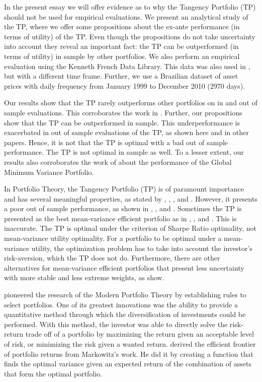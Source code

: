 \documentclass[12pt,oneside,a4paper]{memoir}
\begin{document}
In the present essay we will offer evidence as to why the Tangency Portfolio (TP) should not be used for empirical evaluations.
We present an analytical study of the TP, where we offer some propositions about the ex-ante performance (in terms of utility) of the TP.
Even though the propositions do not take uncertainty into account they reveal an important fact: the TP can be outperformed (in terms of utility) in sample by other portfolios.
We also perform an empirical evaluation using the Kenneth French Data Library.
This data was also used in , but with a different time frame.
Further, we use a Brazilian dataset of asset prices with daily frequency from January 1999 to December 2010 (2970 days).

Our results show that the TP rarely outperforms other portfolios on in and out of sample evaluations.
This corroborates the work in .
Further, our propositions show that the TP can be outperformed in sample.
This underperformance is exacerbated in out of sample evaluations of the TP, as shown here and in other papers. Hence, it is not that the TP is optimal with a bad out of sample performance. The TP is not optimal in sample as well.
To a lesser extent, our results also corroborates the work of  about the performance of the Global Minimum Variance Portfolio.

In Portfolio Theory, the Tangency Portfolio (TP) is of paramount importance and has several meaningful properties, as stated by , , , and .
However, it presents a poor out of sample performance, as shown in , , and .
Sometimes the TP is presented as the best mean-variance efficient portfolio as in , , and .
This is inaccurate.
The TP is optimal under the criterion of Sharpe Ratio optimality, not mean-variance utility optimality.
For a portfolio to be optimal under a mean-variance utility, the optimization problem has to take into account the investor's risk-aversion, which the TP does not do.
Furthermore, there are other alternatives for mean-variance efficient portfolios that present less uncertainty with more stable and less extreme weights, as  show.

 pioneered the research of the Modern Portfolio Theory by establishing rules to select portfolios. One of its greatest innovations was the ability to provide a quantitative method through which the diversification of investments could be performed. With this method, the investor was able to directly solve the risk-return trade off of a portfolio by maximizing the return given an acceptable level of risk, or minimizing the risk given a wanted return.
 derived the efficient frontier of portfolio returns from Markowitz's work.
He did it by creating a function that finds the optimal variance given an expected return of the combination of assets that form the optimal portfolio.
\end{document}
